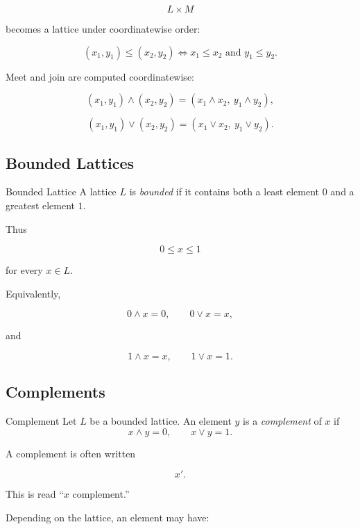 \[ L\times M \]

becomes a lattice under coordinatewise order:

\[ (x_1,y_1)\leq(x_2,y_2)
\iff x_1\leq x_2\text{ and }y_1\leq y_2. \]

Meet and join are computed coordinatewise:

\[ (x_1,y_1)\wedge(x_2,y_2)
=(x_1\wedge x_2,\ y_1\wedge y_2), \]

\[ (x_1,y_1)\vee(x_2,y_2)
=(x_1\vee x_2,\ y_1\vee y_2). \]

\subsection{Bounded Lattices}
\label{subsec:bounded-lattices}

\begin{definitionbox}{Bounded Lattice}
A lattice \(L\) is \emph{bounded} if it contains both a least element \(0\)
and a greatest element \(1\).
\end{definitionbox}

Thus

\[ 0\leq x\leq1 \]

for every \(x\in L\).

Equivalently,

\[ 0\wedge x=0,\qquad0\vee x=x, \]

and

\[ 1\wedge x=x,\qquad1\vee x=1. \]

\subsection{Complements}
\label{subsec:lattice-complements}

\begin{definitionbox}{Complement}
Let \(L\) be a bounded lattice. An element \(y\) is a \emph{complement} of
\(x\) if
\[ x\wedge y=0,\qquad x\vee y=1. \]
\end{definitionbox}

A complement is often written

\[ x'. \]

This is read ``\(x\) complement.''

Depending on the lattice, an element may have:

